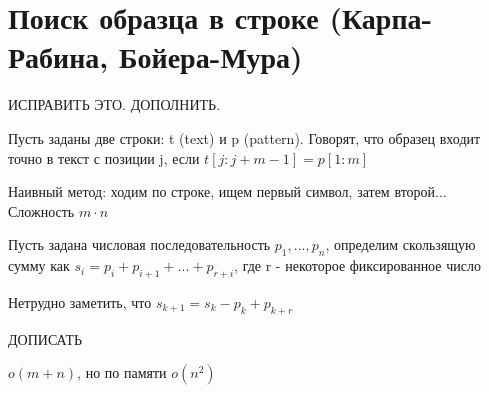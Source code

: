 \documentclass[discrete.tex]{subfiles}
\begin{document}
\section{Поиск образца в строке (Карпа-Рабина, Бойера-Мура)}
ИСПРАВИТЬ ЭТО. ДОПОЛНИТЬ.
\begin{definition}
  Пусть заданы две строки: t (text) и p (pattern). Говорят, что образец входит точно в текст с позиции j, если $t[j:j+m-1] = p[1:m]$
\end{definition}

Наивный метод: ходим по строке, ищем первый символ, затем второй... Сложность $m \cdot n$

\begin{definition}
  Пусть задана числовая последовательность $p_1,...,p_n$, определим скользящую сумму как $s_i=p_i+p_{i+1}+...+p_{r+i}$, где r - некоторое фиксированное число
\end{definition}

\begin{remark}
  Нетрудно заметить, что $s_{k+1} = s_k - p_k + p_{k+r}$
\end{remark}

ДОПИСАТЬ

\begin{alg}
  $o(m+n)$, но по памяти $o(n^2)$
\end{alg}
\end{document}
